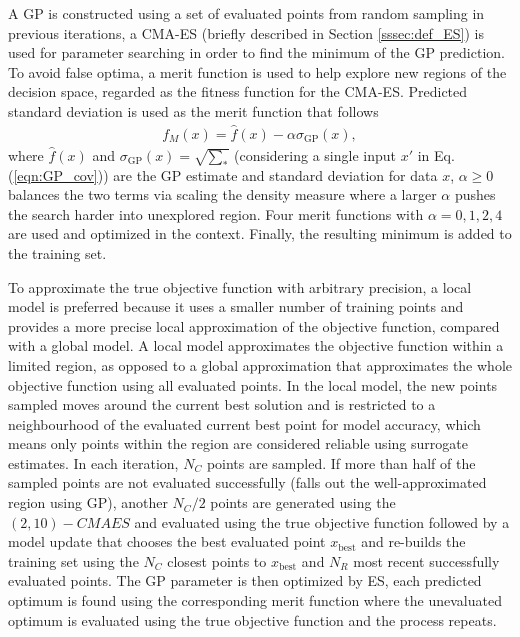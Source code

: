A GP is constructed using a set of evaluated points from random sampling in previous iterations, a CMA-ES (briefly described in Section \ref{sssec:def_ES}) is used for parameter searching in order to find the minimum of the GP prediction. To avoid false optima, a merit function is used to help explore new regions of the decision space, regarded as the fitness function for the CMA-ES.   
Predicted standard deviation  is used as the merit function that follows 
\begin{align}
f_M (x) = \hat f(x) - \alpha \sigma_{\text{GP}} (x),
\end{align}
where $\hat f(x)$ and $\sigma_{\text{GP}} (x)=\sqrt{\sum_*}$ (considering a single input $x \prime$ in Eq. (\ref{eqn:GP_cov})) are the GP estimate and standard deviation for data $x$, $\alpha \geq 0$ balances the two terms via scaling the density measure where a larger $\alpha$ pushes the search harder into unexplored region. Four merit functions with $\alpha =0,1,2,4$ are used and optimized in the context. Finally, the resulting minimum is added to the training set.

To approximate the true objective function with arbitrary precision, a local model is preferred because it uses a smaller number of training points and provides a more precise local approximation of the objective function, compared with a global model. A local model approximates the objective function within a limited region, as opposed to a global approximation that approximates the whole objective function using all evaluated points. In the local model, the new points sampled moves around the current best solution and is restricted to a neighbourhood of the evaluated current best point for model accuracy, which means only points within the region are considered reliable using surrogate estimates. In each iteration, $N_C$ points are sampled. If more than half of the sampled points are not evaluated successfully (falls out the well-approximated region using GP), another $N_C/2$ points are generated using the $(2,10)-CMAES$ and evaluated using the true objective function followed by a model update that chooses the best evaluated point $x_{\text{best}}$ and re-builds the training set using the $N_C$ closest points to $x_{\text{best}}$ and $N_R$ most recent successfully evaluated points. The GP parameter is then optimized by ES, each predicted optimum is found using the corresponding merit function where the unevaluated optimum is evaluated using the true objective function and the process repeats.

